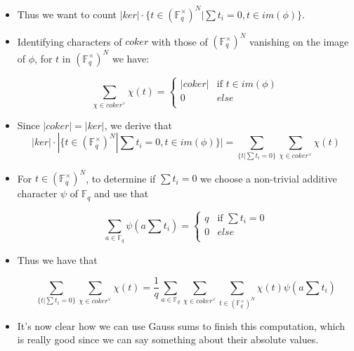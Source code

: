 \documentclass{beamer}
\begin{document}
\begin{frame}
\begin{itemize}
\item Thus we want to count $|ker|\cdot \{t\in (\mathbb{F}_{q}^{\times})^N|\sum t_{i} = 0, t\in im(\phi)\}$.\pause
\item Identifying characters of $coker$ with those of $(\mathbb{F}_{q}^{\times})^N$ vanishing on the image of $\phi$, for $t$ in $(\mathbb{F}_{q}^{\times})^{N}$ we have:

\[
\sum\limits_{\chi \in coker^{\vee}} \chi(t) = \begin{cases}
   |coker| & \mbox{if } t \in im(\phi) \\
   0       &  else \\

  \end{cases}
\]
\pause
\item Since $|coker| = |ker|$, we derive that
$$|ker|\cdot|\{t\in (\mathbb{F}_{q}^{\times})^{N}|\sum t_{i} = 0, t\in im(\phi)\}| = \sum\limits_{\{t | \sum t_{i} = 0\}}\sum\limits_{\chi\in  coker^{\vee}}\chi(t)$$ 


\end{itemize}
\end{frame}

\begin{frame}
\begin{itemize}
\item For $t\in (\mathbb{F}_{q}^{\times})^{N}$, to determine if $\sum t_{i} = 0$ we choose a non-trivial additive character $\psi$ of $\mathbb{F}_{q}$ and use that

\[
\sum\limits_{a\in \mathbb{F}_q}\psi(a\sum t_i) = \begin{cases}
   q & \mbox{if } \sum t_i = 0 \\
   0       &  else \\

  \end{cases}
\]
\pause
\item  Thus we have that 

$$\sum\limits_{\{t | \sum t_{i} = 0\}}\sum\limits_{\chi\in coker^{\vee}}\chi(t)
 = \frac{1}{q}\sum\limits_{a\in \mathbb{F}_q}\sum\limits_{\chi\in
  coker^{\vee}}\sum\limits_{t\in (\mathbb{F}_{q}^{\times})^N} \chi(t)\psi(a\sum t_i)$$
\pause
\item It's now clear how we can use Gauss sums to finish this computation, which is really good since we can say something about their absolute values.  

\end{itemize}
\end{frame}
\end{document}
